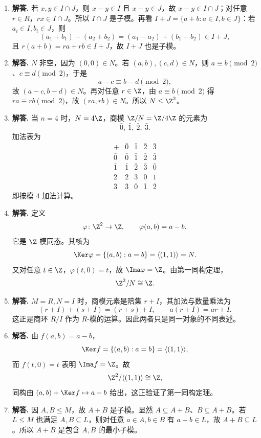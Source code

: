 \begin{enumerate}[label=\textbf{\arabic*.}, leftmargin=*, itemsep=1em]
  \item \textbf{解答.} 若 $x,y\in I\cap J$，则 $x-y\in I$ 且 $x-y\in J$，故 $x-y\in I\cap J$；对任意 $r\in R$，$rx\in I\cap J$。所以 $I\cap J$ 是子模。再看 $I+J=\{a+b:a\in I,b\in J\}$：若 $a_i\in I,b_i\in J$，则
  \[
  (a_1+b_1)-(a_2+b_2)=(a_1-a_2)+(b_1-b_2)\in I+J,
  \]
  且 $r(a+b)=ra+rb\in I+J$，故 $I+J$ 也是子模。

  \item \textbf{解答.} $N$ 非空，因为 $(0,0)\in N$。若 $(a,b),(c,d)\in N$，则 $a\equiv b\pmod 2$、$c\equiv d\pmod 2$，于是
  \[
  a-c\equiv b-d\pmod 2,
  \]
  故 $(a-c,b-d)\in N$。再对任意 $r\in\Z$，由 $a\equiv b\pmod 2$ 得 $ra\equiv rb\pmod 2$，故 $(ra,rb)\in N$。所以 $N\le \Z^2$。

  \item \textbf{解答.} 当 $n=4$ 时，$N=4\Z$，商模 $\Z/N=\Z/4\Z$ 的元素为
  \[
  \bar 0,\ \bar 1,\ \bar 2,\ \bar 3.
  \]
  加法表为
  \[
  \begin{array}{c|cccc}
  +&\bar 0&\bar 1&\bar 2&\bar 3\\\hline
  \bar 0&\bar 0&\bar 1&\bar 2&\bar 3\\
  \bar 1&\bar 1&\bar 2&\bar 3&\bar 0\\
  \bar 2&\bar 2&\bar 3&\bar 0&\bar 1\\
  \bar 3&\bar 3&\bar 0&\bar 1&\bar 2
  \end{array}
  \]
  即按模 $4$ 加法计算。

  \item \textbf{解答.} 定义
  \[
  \varphi\colon \Z^2\to \Z,\qquad \varphi(a,b)=a-b.
  \]
  它是 $\Z$-模同态。其核为
  \[
  \Ker\varphi=\{(a,b):a=b\}=\langle (1,1)\rangle=N.
  \]
  又对任意 $t\in\Z$，$\varphi(t,0)=t$，故 $\Ima\varphi=\Z$。由第一同构定理，
  \[
  \Z^2/N\cong \Z.
  \]

  \item \textbf{解答.} $M=R,N=I$ 时，商模元素是陪集 $r+I$，其加法与数量乘法为
  \[
  (r+I)+(s+I)=(r+s)+I,\qquad a(r+I)=ar+I.
  \]
  这正是商环 $R/I$ 作为 $R$-模的运算。因此两者只是同一对象的不同表述。

  \item \textbf{解答.} 由 $f(a,b)=a-b$，
  \[
  \Ker f=\{(a,b):a=b\}=\langle(1,1)\rangle,
  \]
  而 $f(t,0)=t$ 表明 $\Ima f=\Z$。故
  \[
  \Z^2/\langle(1,1)\rangle\cong \Z,
  \]
  同构由 $(a,b)+\Ker f\mapsto a-b$ 给出，这正验证了第一同构定理。

  \item \textbf{解答.} 因 $A,B\le M$，故 $A+B$ 是子模。显然 $A\subseteq A+B$、$B\subseteq A+B$。若 $L\le M$ 也满足 $A,B\subseteq L$，则对任意 $a\in A,b\in B$ 有 $a+b\in L$，故 $A+B\subseteq L$。所以 $A+B$ 是包含 $A,B$ 的最小子模。


\end{enumerate}
